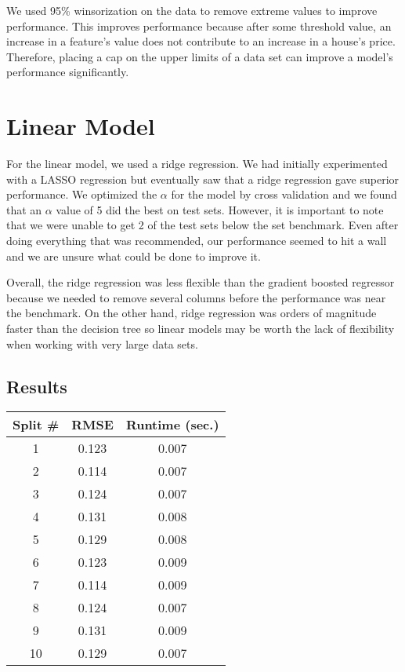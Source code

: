 \documentclass{article}
\begin{document}
We used 95\% winsorization on the data to remove extreme values to improve performance.
This improves performance because after some threshold value, an increase in a feature's 
value does not contribute to an increase in a house's price. Therefore, placing a cap on the upper limits of a data set can improve a model's performance significantly. 

\section{Linear Model}

For the linear model, we used a ridge regression. We had initially experimented with a 
LASSO regression but eventually saw that a ridge regression gave superior performance. 
We optimized the $\alpha$ for the model by cross validation and we found that an $\alpha$ 
value of 5 did the best on test sets. However, it is important to note that we were unable 
to get 2 of the test sets below the set benchmark. Even after doing everything that was 
recommended, our performance seemed to hit a wall and we are unsure what could be done 
to improve it. 

Overall, the ridge regression was less flexible than the gradient boosted regressor because we needed to remove several columns before the performance was near the benchmark. On the other hand, ridge regression was orders of magnitude faster than the decision tree so linear models may be worth the lack of flexibility when working with 
very large data sets. 

\subsection{Results}

\begin{center} 
    \begin{tabular}{ | c |  c |  c |} 
        \hline
        Split \# & RMSE & Runtime (sec.) \\ 
        \hline\hline
        1 & 0.123 & 0.007 \\ 
        \hline 
        2 & 0.114 & 0.007 \\ 
        \hline 
        3 & 0.124 & 0.007 \\ 
        \hline 
        4 & 0.131 & 0.008\\ 
        \hline 
        5 & 0.129 & 0.008 \\ 
        \hline 
        6 & 0.123 & 0.009 \\ 
        \hline
         7 & 0.114 & 0.009 \\ 
         \hline 
        8 & 0.124 & 0.007 \\ 
        \hline 
        9 & 0.131 & 0.009 \\ 
        \hline
        10 & 0.129 & 0.007 \\ 
        \hline 
    \end{tabular} 
\end{center}
\end{document}

